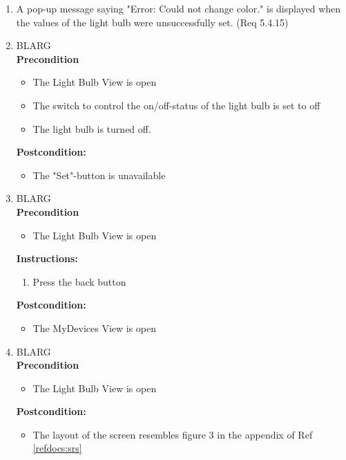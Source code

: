 \documentclass[a4paper]{article}
\newlength{\testlabellength}
\newenvironment{testlist}{\begin{enumerate}[label=\bfseries Instruction \thesubsection.\arabic* , labelindent=0pt, labelwidth=\testlabellength , leftmargin=2cm]}{\end{enumerate}}
\newenvironment{precondition}{
{\color{white}BLARG}\\ 
\textbf{Precondition}
\begin{itemize}[labelindent=0cm, labelwidth=2cm , leftmargin=1cm]
}
{\end{itemize}}
\newenvironment{instruction}{
\textbf{Instructions:}
\begin{enumerate}[label=\bfseries  \arabic*., labelindent=0cm, labelwidth=2cm , leftmargin=1cm]
}
{\end{enumerate}}
\newenvironment{postcondition}{
\textbf{Postcondition:}
\begin{itemize}[labelindent=0cm, labelwidth=2cm , leftmargin=1cm]
}
{\end{itemize}}
\begin{document}
\begin{appendices}
\begin{testlist}
    \item A pop-up message saying "Error: Could not change color." is displayed when the values of the light bulb were unsuccessfully set. (Req 5.4.15)

	\item
		\begin{precondition}
			\item The Light Bulb View is open
			\item The switch to control the on/off-status of the light bulb is set to off
			\item The light bulb is turned off.
		\end{precondition}
		\begin{postcondition}
			\item The "Set"-button is unavailable
		\end{postcondition}

	\item
		\begin{precondition}
			\item The Light Bulb View is open
		\end{precondition}
		\begin{instruction}
			\item Press the back button
		\end{instruction}
		\begin{postcondition}
			\item The MyDevices View is open
		\end{postcondition}
    
	\item
		\begin{precondition}
			\item The Light Bulb View is open
		\end{precondition}
		\begin{postcondition}
			\item The layout of the screen resembles figure 3 in the appendix of Ref \ref{refdocs:srs}
		\end{postcondition}


\end{testlist}
\end{appendices}
\end{document}
